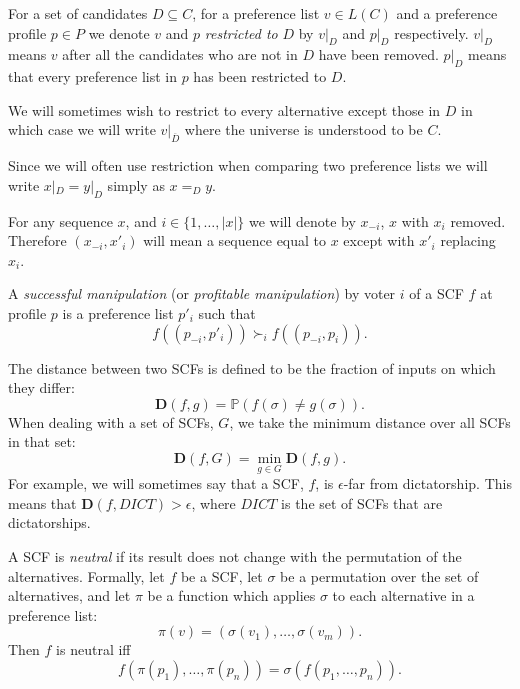 	\begin{definition}
		\label{preference-restriction-definition}
		For a set of candidates $D \subseteq C$, for a preference list $v \in L(C)$ and a preference profile $p \in P$ we denote $v$ and $p$ \emph{restricted to} $D$ by $v|_D$ and $p|_D$ respectively. $v|_D$ means $v$ after all the candidates who are not in $D$ have been removed. $p|_D$ means that every preference list in $p$ has been restricted to $D$.

		We will sometimes wish to restrict to every alternative except those in $D$ in which case we will write $v|_{\overline{D}}$ where the universe is understood to be $C$.

		Since we will often use restriction when comparing two preference lists we will write $x|_D = y|_D$ simply as $x =_D y$.
	\end{definition}

	\begin{definition}
		For any sequence $x$, and $i \in \{1, \ldots, |x|\}$ we will denote by $x_{-i}$, $x$ with $x_i$ removed. Therefore $(x_{-i}, x'_i)$ will mean a sequence equal to $x$ except with $x'_i$ replacing $x_i$.
	\end{definition}

	\begin{definition}
		\label{manipulation-definition}
		A \emph{successful manipulation} (or \emph{profitable manipulation}) by voter $i$ of a SCF $f$ at profile $p$ is a preference list $p'_i$ such that
		\[
			f((p_{-i}, p'_i)) \succ_i f((p_{-i}, p_i)).
		\]
	\end{definition}

	\begin{definition}
		\label{scf-distance-definition}
		The distance between two SCFs is defined to be the fraction of inputs on which they differ:
		\[
			\mathbf{D}(f, g) = \mathbb{P}(f (\sigma) \ne g(\sigma)).
		\]
		When dealing with a set of SCFs, $G$, we take the minimum distance over all SCFs in that set:
		\[
			\mathbf{D}(f, G) = \min_{g \in G} \mathbf{D}(f, g).
		\]
		For example, we will sometimes say that a SCF, $f$, is $\epsilon$-far from dictatorship. This means that $\mathbf{D}(f, DICT) > \epsilon$, where $DICT$ is the set of SCFs that are dictatorships.
	\end{definition}

	\begin{definition}
		A SCF is \emph{neutral} if its result does not change with the permutation of the alternatives. Formally, let $f$ be a SCF, let $\sigma$ be a permutation over the set of alternatives, and let $\pi$ be a function which applies $\sigma$ to each alternative in a preference list:
		\[
			\pi(v) = (\sigma(v_1), \ldots, \sigma(v_m)).
		\]
		Then $f$ is neutral iff
		\[
			f(\pi(p_1), \ldots, \pi(p_n)) = \sigma(f(p_1, \ldots, p_n)).
		\]
	\end{definition}
